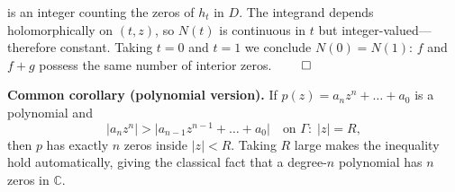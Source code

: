 \documentclass[12pt]{article}
\theoremstyle{definition} %
\theoremstyle{plain} %
\begin{document}
  is an integer counting the zeros of \(h_t\) in \(D\).
  The integrand depends holomorphically on \((t,z)\), so \(N(t)\)
  is continuous in \(t\) but integer-valued—therefore constant.
  Taking \(t=0\) and \(t=1\) we conclude \(N(0)=N(1)\):
  \(f\) and \(f+g\) possess the same number of interior zeros. \(\qed\)
  
  \bigskip
  \textbf{Common corollary (polynomial version).}
  If \(p(z)=a_n z^n+\dots+a_0\) is a polynomial and
  \[
    |a_n z^n| > \bigl|a_{n-1}z^{n-1}+\dots+a_0\bigr|
    \quad\text{on }\Gamma:\;|z|=R,
  \]
  then \(p\) has exactly \(n\) zeros inside \(|z|<R\).  
  Taking \(R\) large makes the inequality hold automatically, giving the
  classical fact that a degree-\(n\) polynomial has \(n\) zeros in \(\mathbb{C}\).
\end{document}
